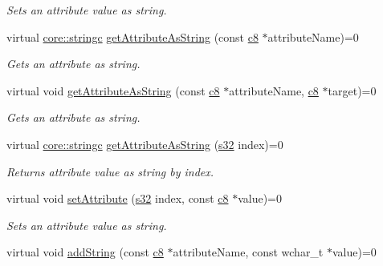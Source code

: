 \begin{DoxyCompactItemize}
\begin{DoxyCompactList}\small\item\em Sets an attribute value as string. \end{DoxyCompactList}\item 
virtual \hyperlink{namespaceirr_1_1core_ab26a0e0359206b5a694f35c37c829d7f}{core\+::stringc} \hyperlink{classirr_1_1io_1_1IAttributes_a60f395fd008a70cc0531fa038c81f0ea}{get\+Attribute\+As\+String} (const \hyperlink{namespaceirr_a9395eaea339bcb546b319e9c96bf7410}{c8} $\ast$attribute\+Name)=0
\begin{DoxyCompactList}\small\item\em Gets an attribute as string. \end{DoxyCompactList}\item 
virtual void \hyperlink{classirr_1_1io_1_1IAttributes_a8d10d4874bcb90143ba11f6c548cff42}{get\+Attribute\+As\+String} (const \hyperlink{namespaceirr_a9395eaea339bcb546b319e9c96bf7410}{c8} $\ast$attribute\+Name, \hyperlink{namespaceirr_a9395eaea339bcb546b319e9c96bf7410}{c8} $\ast$target)=0
\begin{DoxyCompactList}\small\item\em Gets an attribute as string. \end{DoxyCompactList}\item 
virtual \hyperlink{namespaceirr_1_1core_ab26a0e0359206b5a694f35c37c829d7f}{core\+::stringc} \hyperlink{classirr_1_1io_1_1IAttributes_a9938e13ea4cc3e8e0ea3fadacaa97c5c}{get\+Attribute\+As\+String} (\hyperlink{namespaceirr_ac66849b7a6ed16e30ebede579f9b47c6}{s32} index)=0
\begin{DoxyCompactList}\small\item\em Returns attribute value as string by index. \end{DoxyCompactList}\item 
virtual void \hyperlink{classirr_1_1io_1_1IAttributes_a0d270e61c06e6553857f90946fe177f7}{set\+Attribute} (\hyperlink{namespaceirr_ac66849b7a6ed16e30ebede579f9b47c6}{s32} index, const \hyperlink{namespaceirr_a9395eaea339bcb546b319e9c96bf7410}{c8} $\ast$value)=0
\begin{DoxyCompactList}\small\item\em Sets an attribute value as string. \end{DoxyCompactList}\item 
\mbox{\label{classirr_1_1io_1_1IAttributes_a71cc4c6d4368b85a0567a50526eef9a3}} 
virtual void \hyperlink{classirr_1_1io_1_1IAttributes_a71cc4c6d4368b85a0567a50526eef9a3}{add\+String} (const \hyperlink{namespaceirr_a9395eaea339bcb546b319e9c96bf7410}{c8} $\ast$attribute\+Name, const wchar\+\_\+t $\ast$value)=0

\end{DoxyCompactItemize}
